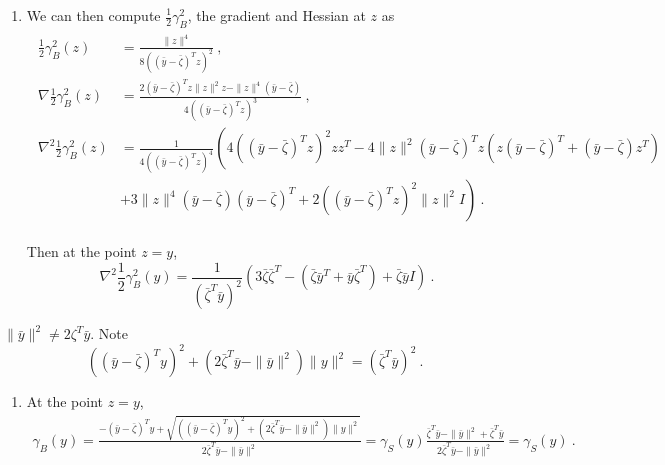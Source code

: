 \documentclass[sn-mathphys,Numbered]{sn-jnl}%
\begin{document}
\begin{appendices}
{\begin{enumerate}[label=(\alph*)]
\item We can then compute $\frac{1}{2}\gamma^2_B$, the gradient and Hessian at $z$ as
\begin{align*}
\begin{split}
\frac{1}{2}\gamma_B^2(z) &=\frac{\|z\|^4}{8\left((\bar y -\bar \zeta)^Tz\right)^2} \ ,\\
\nabla \frac{1}{2}\gamma_B^2(z) &= \frac{2(\bar y -\bar \zeta)^Tz\|z\|^2z-\|z\|^4(\bar y- \bar \zeta)}{4\left((\bar y-\bar \zeta)^Tz\right)^3} \ , \\
\nabla ^2 \frac{1}{2}\gamma_B^2(z) &= \frac{1}{4\left((\bar y-\bar \zeta)^Tz\right)^4}\left(4((\bar y-\bar \zeta)^Tz)^2zz^T-4\|z\|^2(\bar y-\bar \zeta)^Tz(z(\bar y-\bar \zeta)^T+(\bar y-\bar \zeta)z^T)\right.  \\ &\left.+3\|z\|^4(\bar y-\bar \zeta)(\bar y-\bar \zeta)^T+2((\bar y-\bar \zeta)^Tz)^2\|z\|^2 I\right) \ .
 \end{split}
\end{align*}

Then at the point $z=y$, 
$$\nabla ^2 \frac{1}{2}\gamma_B^2(y) = \frac{1}{(\bar \zeta^T \bar y)^2}\left(3\bar \zeta \bar \zeta^T - (\bar \zeta \bar y^T+\bar y \bar \zeta^T) +\bar \zeta \bar y I\right) \ .
$$
\end{enumerate}

 $\|\bar y\|^2 \neq 2\zeta^T \bar y$. Note
\begin{equation} \label{eq:sum_square}
((\bar y -\bar \zeta)^Ty)^2+(2\bar \zeta^T \bar y -\|\bar y\|^2)\|y\|^2=(\bar \zeta ^T \bar y)^2 \ .
\end{equation}

\begin{enumerate}[label=(\alph*)]
\item At the point $z=y$,  
\begin{align*}
    \gamma_B(y)=\frac{-(\bar y -\bar \zeta)^Ty+\sqrt{((\bar y -\bar \zeta)^Ty)^2+(2\bar \zeta^T \bar y -\|\bar y\|^2)\|y\|^2}}{2\bar \zeta^T \bar y -\|\bar y\|^2} 
    =\gamma_S(y)\frac{\bar \zeta^T\bar y-\|\bar y\|^2+\bar \zeta^T\bar y}{2\bar \zeta^T \bar y -\|\bar y\|^2} 
    =\gamma _S(y) \ .
\end{align*}


\end{enumerate}}
\end{appendices}
\end{document}
